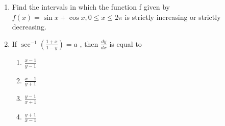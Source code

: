 \begin{enumerate}[label=\thesection.\arabic*.,ref=\thesection.\theenumi]
\item Find the intervals in which the function f given by $f(x)=\sin x+\cos x, 0 \le x \le 2\pi$ is strictly increasing or strictly decreasing.


\item If $\sec^{-1}(\frac{1+x}{1-y})=a$ , then $\frac{dy}{dx}$ is equal to
\begin{enumerate}
\item $\frac{x-1}{y-1}$
\item $\frac{x-1}{y+1}$
\item $\frac{y-1}{x+1}$
\item $\frac{y+1}{x-1}$
\end{enumerate}

\end{enumerate}

